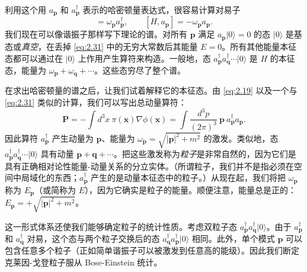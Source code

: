 利用这个用 $a_{\mathbf{p}}$ 和 $a_{\mathbf{p}}^\dagger$ 表示的哈密顿量表达式，很容易计算对易子
\begin{equation}
  [H, a_{\mathbf{p}}^\dagger] = \omega_{\mathbf{p}}a_{\mathbf{p}}^\dagger,
  \qquad [H, a_{\mathbf{p}}] = -\omega_{\mathbf{p}}a_{\mathbf{p}} .
  \label{eq:2.32}
\end{equation}
我们现在可以像谐振子那样写下理论的谱。对所有 $\mathbf{p}$ 满足 $a_{\mathbf{p}}|0\rangle = 0$ 的态 $|0\rangle$ 是基态或\emph{真空}，在丢掉 \eqref{eq:2.31} 中的无穷大常数后其能量 $E=0$。所有其他能量本征态都可以通过在 $|0\rangle$ 上作用产生算符来构造。一般地，态 $a_{\mathbf{p}}^\dagger a_{\mathbf{q}}^\dagger\cdots|0\rangle$ 是 $H$ 的本征态，能量为 $\omega_{\mathbf{p}} + \omega_{\mathbf{q}} + \cdots$。这些态穷尽了整个谱。

在求出哈密顿量的谱之后，让我们试着解释它的本征态。由 \eqref{eq:2.19} 以及一个与 \eqref{eq:2.31} 类似的计算，我们可以写出总动量算符：
\begin{equation}
  \mathbf{P} = -\int d^3x\ \pi(\mathbf{x})\nabla\phi(\mathbf{x})
  = \int \frac{d^3p}{(2\pi)^3}\ \mathbf{p}\ a_{\mathbf{p}}^\dagger
    a_{\mathbf{p}} .
  \label{eq:2.33}
\end{equation}
因此算符 $a_{\mathbf{p}}^\dagger$ 产生动量为 $\mathbf{p}$、能量为 $\omega_{\mathbf{p}} = \sqrt{|\mathbf{p}|^2+m^2}$ 的激发。类似地，态 $a_{\mathbf{p}}^\dagger a_{\mathbf{q}}^\dagger\cdots|0\rangle$ 具有动量 $\mathbf{p}+\mathbf{q}+\cdots$。把这些激发称为\emph{粒子}是非常自然的，因为它们是具有正确相对论性能量-动量关系的分立实体。（所谓粒子，我们并不是指必须在空间中局域化的东西；$a_{\mathbf{p}}^\dagger$ 产生的是动量本征态中的粒子。）从现在起，我们将把 $\omega_{\mathbf{p}}$ 称为 $E_{\mathbf{p}}$（或简称为 $E$），因为它确实是粒子的能量。顺便注意，能量总是正的：$E_{\mathbf{p}} = +\sqrt{|\mathbf{p}|^2+m^2}$。

这一形式体系还使我们能够确定粒子的统计性质。考虑双粒子态 $a_{\mathbf{p}}^\dagger a_{\mathbf{q}}^\dagger|0\rangle$。由于 $a_{\mathbf{p}}^\dagger$ 和 $a_{\mathbf{q}}^\dagger$ 对易，这个态与两个粒子交换后的态 $a_{\mathbf{q}}^\dagger a_{\mathbf{p}}^\dagger |0\rangle$ 相同。此外，单个模式 $\mathbf{p}$ 可以包含任意多个粒子（正如简单谐振子可以被激发到任意高的能级）。因此我们断定克莱因-戈登粒子服从 Bose-Einstein 统计。

